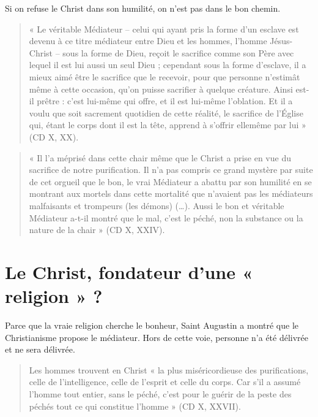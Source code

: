 Si on refuse le Christ dans son humilité, on n'est pas dans le bon chemin. 

\begin{quote}
    « Le véritable Médiateur – celui qui ayant pris la forme d’un esclave est devenu à ce titre médiateur entre Dieu et les hommes, l’homme Jésus-Christ – sous la forme de Dieu, reçoit le sacrifice comme son Père avec lequel il est lui aussi un seul Dieu ; cependant sous la forme d’esclave, il a mieux aimé être le sacrifice que le recevoir, pour que personne n’estimât même à cette occasion, qu’on puisse sacrifier à quelque créature. Ainsi est-il prêtre : c’est lui-même qui offre, et il est lui-même l’oblation. Et il a voulu que soit sacrement quotidien de cette réalité, le sacrifice de l’Église qui, étant le corps dont il est la tête, apprend à s’offrir ellemême par lui » (CD X, XX). 
\end{quote}
  \begin{quote}
      « Il l’a méprisé dans cette chair même que le Christ a prise en vue du sacrifice de notre purification.  Il n’a pas compris ce grand mystère par suite de cet orgueil que le bon, le vrai Médiateur a abattu par son humilité en se montrant aux mortels dans cette mortalité que n’avaient pas les médiateurs malfaisants et trompeurs (les démons) (…). Aussi le bon et véritable Médiateur a-t-il montré que le mal, c’est le péché, non la substance ou la nature de la chair » (CD X, XXIV). 
      
        \end{quote} 

\section{ Le Christ, fondateur d’une « religion » ? }





\begin{Synthesis}
Parce que la vraie religion cherche le bonheur, Saint Augustin a montré que le Christianisme propose le médiateur. Hors de cette voie, personne n'a été délivrée et ne sera délivrée.
\end{Synthesis}

  \begin{quote}
      Les hommes trouvent en Christ « la plus miséricordieuse des purifications, celle de l’intelligence, celle de l’esprit et celle du corps. Car s’il a assumé l’homme tout entier, sans le péché, c’est pour le guérir de la peste des péchés tout ce qui constitue l’homme » (CD X, XXVII). 
  \end{quote}
  

